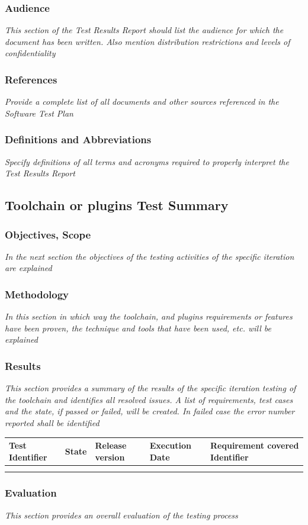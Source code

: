 \begin{appendices}
\subsubsection{Audience}
\textit{This section of the Test Results Report should list the audience for which the document has been written. Also mention distribution restrictions and levels of confidentiality}
\subsubsection{References}
\textit{Provide a complete list of all documents and other sources referenced in the Software Test Plan}
\subsubsection{Definitions and Abbreviations}
\textit{Specify definitions of all terms and acronyms required to properly interpret the Test Results Report}

\subsection{Toolchain or plugins Test Summary}
\subsubsection{Objectives, Scope}
\textit{In the next section the objectives of the testing activities of the specific iteration are explained}
\subsubsection{Methodology}
\textit{In this section in which way the toolchain, and plugins requirements or features have been proven, the technique and tools that have been used, etc. will be explained}
\subsubsection{Results}
\textit{This section provides a summary of the results of the specific iteration testing of the toolchain and identifies all resolved issues. A list of requirements, test cases and the state, if passed or failed, will be created. In failed case the error number reported shall be identified}

\begin{center}
\begin{longtable}{|p{3cm}|p{2cm}|p{3cm}|p{3cm}|p{2cm}|}\hline
Test Identifier & State & Release version & Execution Date & Requirement covered Identifier\\\hline
 & & & & \\\hline
 & & & & \\\hline
\end{longtable}
\end{center}
\subsubsection{Evaluation}
\textit{This section provides an overall evaluation of the testing process}
\end{appendices}
